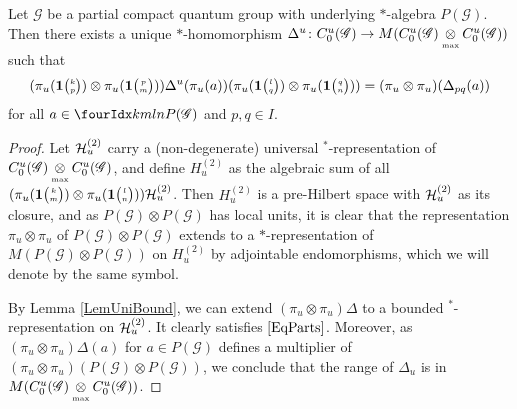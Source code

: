 \begin{Prop}
Let $\mathscr{G}$ be a partial compact quantum group with underlying
$*$-algebra $P(\mathscr{G})$. Then  there exists a unique $*$-homomorphism $\Delta^{u}\colon
  C^{u}_{0}(\mathscr{G}) \to M(C^{u}_{0}(\mathscr{G}) \underset{{\scriptscriptstyle \mathrm{ max}}}{\otimes}
  C^{u}_{0}(\mathscr{G}))$ such that 
  \begin{equation}\label{EqParts}
    (\pi_u(\mathbf{1}{\tiny {\begin{pmatrix} k\\p\end{pmatrix}}}) \otimes
    \pi_u(\mathbf{1}{\tiny {\begin{pmatrix} p\\m\end{pmatrix}}}))\Delta^{u}(\pi_{u}(a))(\pi_u(\mathbf{1}{\tiny {\begin{pmatrix} l\\q\end{pmatrix}}})\otimes \pi_u(\mathbf{1}{\tiny {\begin{pmatrix} q\\n\end{pmatrix}}})) =
    (\pi_{u}  \otimes \pi_{u})(\Delta_{pq}(a))
  \end{equation}
  for all $a \in \Gr{P(\mathscr{G})}{k}{l}{m}{n}$ and $p,q\in I$.
\end{Prop}
\begin{proof}

Let $\mathcal{H}_u^{(2)}$ carry a (non-degenerate) universal $^*$-representation of $C_0^u(\mathscr{G})\underset{{\scriptscriptstyle \mathrm{ max}}}{\otimes} C_0^u(\mathscr{G})$, and define $H_u^{(2)}$ as the algebraic sum of all $(\pi_u(\mathbf{1}{\tiny {\begin{pmatrix} k\\m\end{pmatrix}}}) \otimes \pi_u(\mathbf{1}{\tiny {\begin{pmatrix} l\\n\end{pmatrix}}}))\mathcal{H}_u^{(2)}$. Then $H_u^{(2)}$ is a pre-Hilbert space with $\mathcal{H}_u^{(2)}$ as its closure, and as $P(\mathscr{G})\otimes P(\mathscr{G})$ has local units, it is clear that the representation $\pi_u\otimes \pi_u$ of $P(\mathscr{G})\otimes P(\mathscr{G})$ extends to a $ *$-representation of $M(P(\mathscr{G})\otimes P(\mathscr{G}))$ on $H_u^{(2)}$ by adjointable endomorphisms, which we will denote by the same symbol.

By Lemma \ref{LemUniBound}, we can extend $(\pi_u\otimes \pi_u)\Delta$ to a bounded $^*$-representation on $\mathcal{H}_u^{(2)}$. It clearly satisfies $\eqref{EqParts}$. Moreover, as $(\pi_u\otimes \pi_u)\Delta(a)$ for $a\in P(\mathscr{G})$ defines a multiplier of $(\pi_u\otimes \pi_u)(P(\mathscr{G})\otimes P(\mathscr{G}))$, we conclude that the range of $\Delta_u$ is in $M(C_0^u(\mathscr{G})\underset{{\scriptscriptstyle \mathrm{ max}}}{\otimes} C_0^u(\mathscr{G}))$.
\end{proof}

